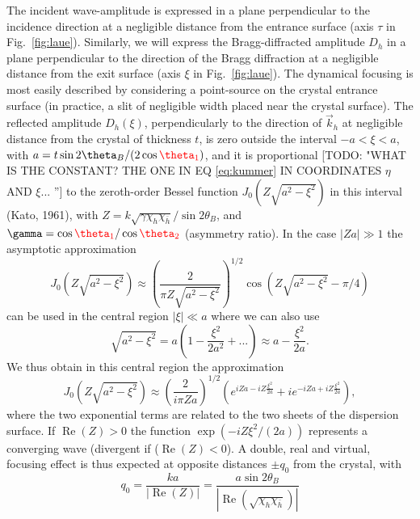 \documentclass[preprint]{iucr}              %
\newcommand{\todo}[1]{{\color{red}[TODO: "#1'']}}
\newcommand{\inred}[1]{{\color{red}#1}}
\begin{document}
\inred{The incident wave-amplitude is expressed in a plane perpendicular to the incidence direction at a negligible distance from the entrance surface (axis $\tau$ in Fig.~\ref{fig:laue}).
Similarly, we will express the Bragg-diffracted amplitude $D_h$ in a plane perpendicular to the direction of the Bragg diffraction at a negligible distance from the exit surface (axis $\xi$ in Fig.~\ref{fig:laue}).} The dynamical focusing is most easily described by considering a point-source on the crystal entrance surface (in practice, a slit of negligible width placed near the crystal surface). 
The reflected amplitude $D_h(\xi)$, perpendicularly to the direction of $\vec k_h$ at negligible distance from the crystal of thickness $t$, is zero outside the interval $-a<\xi<a$, with $a=t \sin2\theta_B/(2 \cos\inred{\theta_1})$, and it is proportional \todo{WHAT IS THE CONSTANT? THE ONE IN EQ \ref{eq:kummer} IN COORDINATES $\eta$ AND $\xi$... } to the zeroth-order Bessel function  $J_0(Z\sqrt{a^2-\xi^2})$ in this interval (Kato, 1961), with  $Z=k\sqrt{\gamma\chi_h\chi_{\bar h}}/\sin2\theta_B$, and $\gamma=\cos\inred{\theta_1}/\cos\inred{\theta_2}$ (asymmetry ratio). In the case $|Z a| \gg 1$ the asymptotic approximation
\begin{equation}
    J_0(Z\sqrt{a^2-\xi^2})\approx \left(\frac{2}{\pi Z \sqrt{a^2-\xi^2}}\right)^{1/2} \cos(Z\sqrt{a^2-\xi^2}-\pi/4)
\end{equation}
can be used in the central region $|\xi|\ll a$ where we can also use
\begin{equation}
     \sqrt{a^2-\xi^2} = a (1-\frac{\xi^2}{2a^2}+...)\approx a - \frac{\xi^2}{2a}.
\end{equation}
We thus obtain in this central region the approximation
\begin{equation}
\label{eq:approximatedDiffractedField}
    J_0(Z\sqrt{a^2-\xi^2})\approx \left(\frac{2}{i \pi Z a}\right)^{1/2} \left( e^{iZa-i Z\frac{ \xi^2}{2a}} + i 
    e^{-i Z a+i Z\frac{\xi^2}{2a}} \right),
\end{equation}
where the two exponential terms are related to the two sheets of the dispersion surface. 
If $\operatorname{Re}(Z)>0$ the function $\exp(- i Z \xi^2 / (2 a))$ 
represents a converging wave (divergent if  ($\operatorname{Re}(Z)<0$). A double, real and virtual, focusing effect is thus expected at opposite distances $\pm q_0$ from the crystal, with
\begin{equation}
\label{eq:q0}
    q_0 = \frac{k a}{|\operatorname{Re}(Z)|}= \frac{a \sin2\theta_B}{|\operatorname{Re}(\sqrt{\chi_h\chi_{\bar h}})|}
\end{equation}
\end{document}
